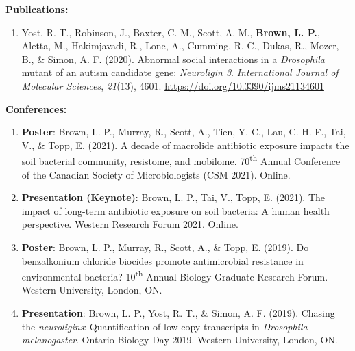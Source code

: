 \textbf{Publications:}\\
\begin{enumerate}
  \item{Yost, R. T., Robinson, J., Baxter, C. M., Scott, A. M., \textbf{Brown, L. P.}, Aletta, M., Hakimjavadi, R., Lone, A., Cumming, R. C., Dukas, R., Mozer, B., \& Simon, A. F. (2020). Abnormal social interactions in a \textit{Drosophila} mutant of an autism candidate gene: \textit{Neuroligin 3}. \textit{International Journal of Molecular Sciences}, \textit{21}(13), 4601. \url{https://doi.org/10.3390/ijms21134601}}
\end{enumerate}
\textbf{Conferences:}\\
\begin{enumerate}
  \item{\textbf{Poster}: Brown, L. P., Murray, R., Scott, A., Tien, Y.-C., Lau, C. H.-F., Tai, V., \& Topp, E. (2021). A decade of macrolide antibiotic exposure impacts the soil bacterial community, resistome, and mobilome. 70\textsuperscript{th} Annual Conference of the Canadian Society of Microbiologists (CSM 2021). Online.}
  \item{\textbf{Presentation (Keynote)}: Brown, L. P., Tai, V., Topp, E. (2021). The impact of long-term antibiotic exposure on soil bacteria: A human health perspective. Western Research Forum 2021. Online.}
  \item{\textbf{Poster}: Brown, L. P., Murray, R., Scott, A., \& Topp, E. (2019). Do benzalkonium chloride biocides promote antimicrobial resistance in environmental bacteria? 10\textsuperscript{th} Annual Biology Graduate Research Forum. Western University, London, ON.}
  \item{\textbf{Presentation}: Brown, L. P., Yost, R. T., \& Simon, A. F. (2019). Chasing the \textit{neuroligins}: Quantification of low copy transcripts in \textit{Drosophila melanogaster}. Ontario Biology Day 2019. Western University, London, ON.}
\end{enumerate}
